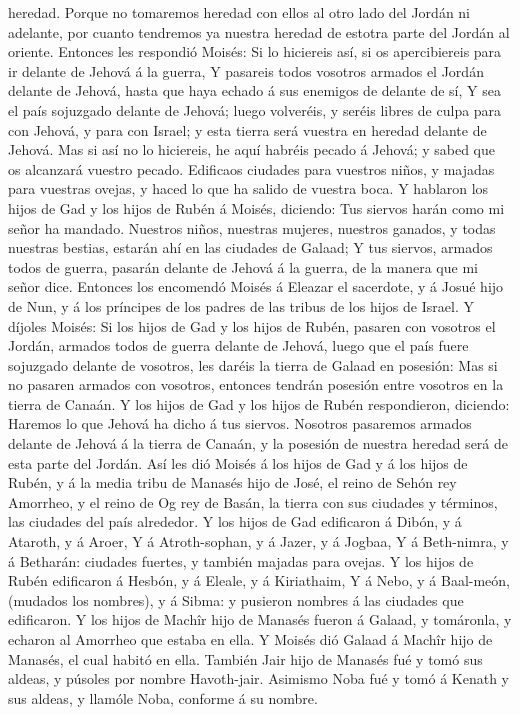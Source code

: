 heredad.  Porque no tomaremos heredad con ellos al otro
lado del Jordán ni adelante, por cuanto tendremos ya nuestra heredad de
estotra parte del Jordán al oriente.  Entonces les
respondió Moisés: Si lo hiciereis así, si os apercibiereis para ir
delante de Jehová á la guerra,  Y pasareis todos vosotros
armados el Jordán delante de Jehová, hasta que haya echado á sus
enemigos de delante de sí,  Y sea el país sojuzgado
delante de Jehová; luego volveréis, y seréis libres de culpa para con
Jehová, y para con Israel; y esta tierra será vuestra en heredad delante
de Jehová.  Mas si así no lo hiciereis, he aquí habréis
pecado á Jehová; y sabed que os alcanzará vuestro pecado.
 Edificaos ciudades para vuestros niños, y majadas para
vuestras ovejas, y haced lo que ha salido de vuestra boca.
 Y hablaron los hijos de Gad y los hijos de Rubén á
Moisés, diciendo: Tus siervos harán como mi señor ha mandado.
 Nuestros niños, nuestras mujeres, nuestros ganados, y
todas nuestras bestias, estarán ahí en las ciudades de Galaad;
 Y tus siervos, armados todos de guerra, pasarán delante
de Jehová á la guerra, de la manera que mi señor dice. 
Entonces los encomendó Moisés á Eleazar el sacerdote, y á Josué hijo de
Nun, y á los príncipes de los padres de las tribus de los hijos de
Israel.  Y díjoles Moisés: Si los hijos de Gad y los
hijos de Rubén, pasaren con vosotros el Jordán, armados todos de guerra
delante de Jehová, luego que el país fuere sojuzgado delante de
vosotros, les daréis la tierra de Galaad en posesión: 
Mas si no pasaren armados con vosotros, entonces tendrán posesión entre
vosotros en la tierra de Canaán.  Y los hijos de Gad y
los hijos de Rubén respondieron, diciendo: Haremos lo que Jehová ha
dicho á tus siervos.  Nosotros pasaremos armados delante
de Jehová á la tierra de Canaán, y la posesión de nuestra heredad será
de esta parte del Jordán.  Así les dió Moisés á los hijos
de Gad y á los hijos de Rubén, y á la media tribu de Manasés hijo de
José, el reino de Sehón rey Amorrheo, y el reino de Og rey de Basán, la
tierra con sus ciudades y términos, las ciudades del país alrededor.
 Y los hijos de Gad edificaron á Dibón, y á Ataroth, y á
Aroer,  Y á Atroth-sophan, y á Jazer, y á Jogbaa,
 Y á Beth-nimra, y á Betharán: ciudades fuertes, y
también majadas para ovejas.  Y los hijos de Rubén
edificaron á Hesbón, y á Eleale, y á Kiriathaim,  Y á
Nebo, y á Baal-meón, (mudados los nombres), y á Sibma: y pusieron
nombres á las ciudades que edificaron.  Y los hijos de
Machîr hijo de Manasés fueron á Galaad, y tomáronla, y echaron al
Amorrheo que estaba en ella.  Y Moisés dió Galaad á
Machîr hijo de Manasés, el cual habitó en ella.  También
Jair hijo de Manasés fué y tomó sus aldeas, y púsoles por nombre
Havoth-jair.  Asimismo Noba fué y tomó á Kenath y sus
aldeas, y llamóle Noba, conforme á su nombre.

